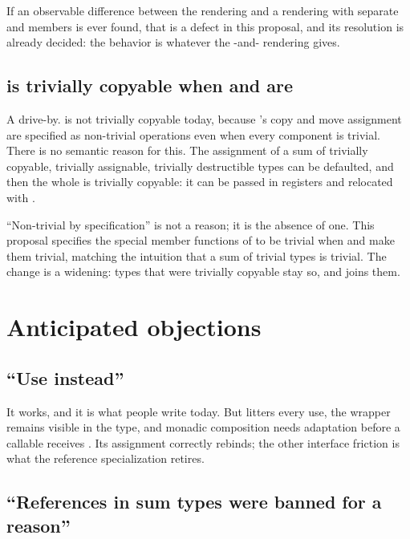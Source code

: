 \documentclass[a4paper,10pt,oneside,openany,final,article]{memoir}
\begin{document}
If an observable
difference between the  rendering and a rendering with
separate  and  members is ever found, that is a defect in this
proposal, and its resolution is already decided: the behavior is whatever the
-and- rendering gives.

\section{ is trivially copyable when  and
   are}

A drive-by.  is not trivially copyable today, because
's copy and move assignment are specified as non-trivial
operations even when every component is trivial. There is no semantic reason for
this. The assignment of a sum of trivially copyable, trivially assignable,
trivially destructible types can be defaulted, and then the whole
 is trivially copyable: it can be passed in registers and
relocated with .

``Non-trivial by specification'' is not a reason; it is the absence of one. This
proposal specifies the special member functions of  to be trivial
when  and  make them trivial, matching the intuition that a sum
of trivial types is trivial. The change is a widening: types that were trivially
copyable stay so, and  joins them.

\chapter{Anticipated objections}

\section{``Use  instead''}

It works, and it is what people write today. But  litters every
use, the wrapper remains visible in the type, and monadic composition needs
adaptation before a callable receives . Its assignment correctly
rebinds; the other interface friction is what the reference specialization
retires.

\section{``References in sum types were banned for a reason''}
\end{document}
